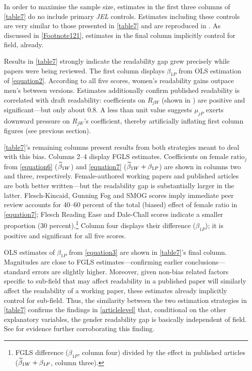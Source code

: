 In order to maximise the sample size, estimates in the first three columns of \autoref{table7} do no include primary \emph{JEL} controls. Estimates including these controls are very similar to those presented in \autoref{table7} and are reproduced in . As discussed in \autoref{Footnote121}, estimates in the final column implicitly control for field, already.

Results in \autoref{table7} strongly indicate the readability gap grew precisely while papers were being reviewed. The first column displays $\beta_{1P}$ from OLS estimation of \autoref{equation2}. According to all five scores, women's readability gains outpace men's between versions. Estimates additionally confirm published readability is correlated with draft readability: coefficients on $R_{jW}$ (shown in ) are positive and significant---but only about 0.8. A less than unit value suggests $\mu_{jP}$ exerts downward pressure on $R_{jW}$'s coefficient, thereby artificially inflating first column figures (see previous section).



\autoref{table7}'s remaining columns present results from both strategies meant to deal with this bias. Columns 2--4 display FGLS estimates. Coefficients on $\text{female ratio}_j$ from \autoref{equation6} ($\widetilde\beta_{1W}$) and \autoref{equation7} ($\widetilde\beta_{1W}+\beta_{1P}$) are shown in columns two and three, respectively. Female-authored working papers and published articles are both better written---but the readability gap is substantially larger in the latter. Flesch-Kincaid, Gunning Fog and SMOG scores imply immediate peer review accounts for 40--60 percent of the total (biased) effect of female ratio in \autoref{equation7}; Flesch Reading Ease and Dale-Chall scores indicate a smaller proportion (30 percent).\footnote{FGLS difference ($\beta_{1P}$, column four) divided by the effect in published articles ($\widetilde\beta_{1W}+\beta_{1P}$, column three).} Column four displays their difference ($\beta_{1P}$); it is positive and significant for all five scores.

OLS estimates of $\beta_{1P}$ from \autoref{equation3} are shown in \autoref{table7}'s final column. Magnitudes are close to FGLS estimates---confirming earlier conclusions---standard errors are slightly higher. Moreover, given non-bias related factors specific to sub-field that may affect readability in a published paper will similarly affect the readability of a working paper, these estimates already implicitly control for sub-field. Thus, the similarity between the two estimation strategies in \autoref{table7} confirms the findings in \autoref{articlelevel} that, conditional on the other explanatory variables, the gender readability gap is basically independent of field. See  for evidence further corroborating this finding.


